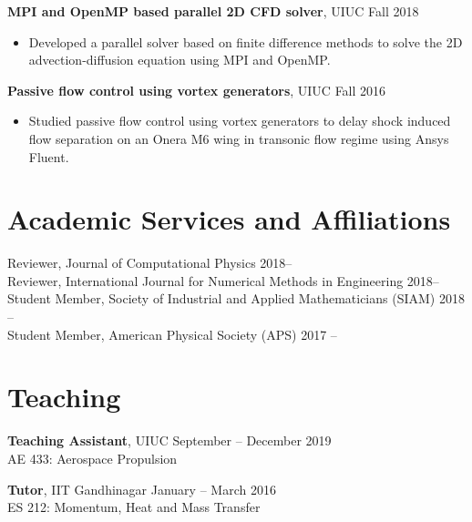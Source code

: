 \documentclass[margin]{res}
\begin{document}
\begin{resume}
{\bf MPI and OpenMP based parallel 2D CFD solver}, UIUC \hfill Fall 2018
\begin{itemize}
\item Developed a parallel solver based on finite difference methods to solve the 2D advection-diffusion equation using MPI and OpenMP.
\end{itemize}

{\bf Passive flow control using vortex generators}, UIUC \hfill Fall 2016
\begin{itemize}
\item Studied passive flow control using vortex generators to delay shock induced flow separation on an Onera M6 wing in transonic flow regime using Ansys Fluent.
\end{itemize}

\section{\large Academic Services and Affiliations}		 
Reviewer, Journal of Computational Physics \hfill 2018--\vspace{0.1cm}\\
Reviewer, International Journal for Numerical Methods in Engineering \hfill 2018--\vspace{0.1cm}\\
Student Member, Society of Industrial and Applied Mathematicians (SIAM) \hfill 2018 --\vspace{0.1cm}\\
Student Member, American Physical Society (APS) \hfill 2017 --
		 
\section{\large Teaching}
{\bf Teaching Assistant}, UIUC \hfill September -- December 2019 \\
AE 433: Aerospace Propulsion
\vspace{-0.1cm}

{\bf Tutor}, IIT Gandhinagar \hfill January -- March 2016 \\
ES 212: Momentum, Heat and Mass Transfer
\vspace{-0.1cm}


\end{resume}
\end{document}
